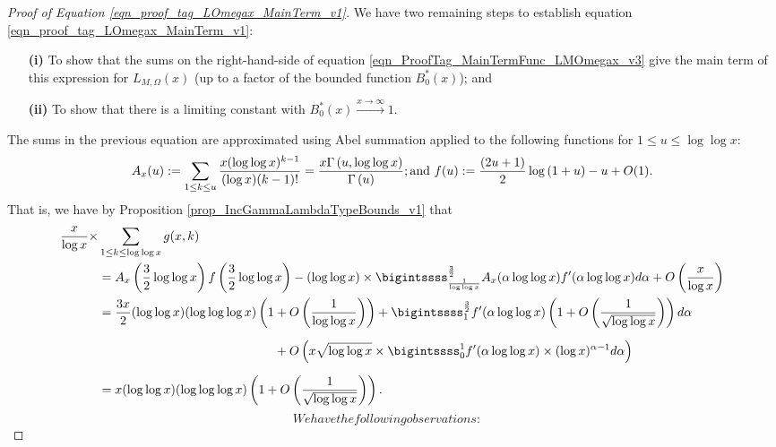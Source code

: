 \documentclass[11pt,reqno,a4letter]{article}
\newcommand{\hlocalref}[1]{\hyperref[#1]{\ref{#1}}}
\numberwithin{equation}{section}
\numberwithin{figure}{section}
\numberwithin{table}{section}
\theoremstyle{plain}
\numberwithin{theorem}{section}
\theoremstyle{definition}
\theoremstyle{remark}
\newcommand{\mathtext}[1]{\text{\rm #1}}
\begin{document}
\begin{proof}[Proof of Equation \eqref{eqn_proof_tag_LOmegax_MainTerm_v1}]
We have two remaining steps to establish equation \eqref{eqn_proof_tag_LOmegax_MainTerm_v1}: 
\begin{itemize}[leftmargin=0.5in]
\item[\textbf{(i)}] To show that the sums on the right-hand-side of equation 
     \eqref{eqn_ProofTag_MainTermFunc_LMOmegax_v3} give the main term of this expression for 
     $L_{M,\Omega}(x)$ (up to a factor of the bounded function $B_0^{\ast}(x)$); and 
\item[\textbf{(ii)}] To show that there is a limiting constant with 
     $B_0^{\ast}(x) \xrightarrow{x \rightarrow \infty} 1$. 
\end{itemize}
The sums in the previous equation are approximated using Abel summation applied to the 
following functions for $1 \leq u \leq \log\log x$: 
\[
A_x(u) := \sum_{1 \leq k \leq u} \frac{x (\log\log x)^{k-1}}{(\log x) (k-1)!} = 
     \frac{x \Gamma\left(u, \log\log x\right)}{\Gamma\left(u\right)}; 
     \mathtext{ and } 
     f(u) := \frac{(2u+1)}{2} \log\left(1 + u\right) - u + O(1). 
\]
That is, we have by Proposition \hlocalref{prop_IncGammaLambdaTypeBounds_v1} that 
\begin{align}
\notag
\frac{x}{\log x} \times & \sum_{1 \leq k \leq \log\log x} g(x, k) \\ 
\notag
     & = A_x\left(\frac{3}{2} \log\log x\right) f\left(\frac{3}{2} \log\log x\right) - 
     (\log\log x) \times 
     \bigintssss_{\frac{1}{\log\log x}}^{\frac{3}{2}} 
     A_x(\alpha \log\log x) f^{\prime}(\alpha \log\log x) d\alpha + 
     O\left(\frac{x}{\log x}\right) \\ 
\notag 
     & = 
     \frac{3x}{2} (\log\log x) (\log\log\log x) \left(1 + 
     O\left(\frac{1}{\log\log x}\right)\right) + 
     \bigintssss_1^{\frac{3}{2}} f^{\prime}(\alpha \log\log x) \left(1 + 
     O\left(\frac{1}{\sqrt{\log\log x}}\right)\right) d\alpha \\ 
\notag
     & \phantom{\frac{3x}{2} (\log\log x) (\log\log\log x)\Biggl(1 + \ \ } + 
     O\left(x \sqrt{\log\log x} \times \bigintssss_0^1 f^{\prime}(\alpha \log\log x) \times 
     (\log x)^{\alpha - 1} d\alpha\right) \\
\label{eqn_proof_tag_LOmegax_MainTerm_v2}
	& = 
	x (\log\log x)(\log\log\log x) \left(1 + 
     O\left(\frac{1}{\sqrt{\log\log x}}\right)\right). 
\end{align}
\begin{subequations}
\label{eqn_ProofTag_MiscObservations_EMMVT_v1}
We have the following observations: 
\begin{align}

\end{align}
\end{subequations}
\end{proof}
\end{document}
